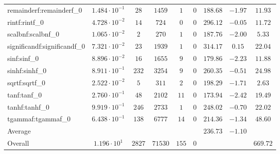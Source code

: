 \begin{tabular}{|l|c|c|c|c|c|c|c|c|}
remainderf:remainderf\_0     & $ 1.484 \cdot 10^{-1} $ & $ 28     $ & $ 1459  $ & $ 1   $ & $ 0   $ & $ 188.68      $ & $ -1.97   $ & $ 11.93   $ \\
rintf:rintf\_0               & $ 4.728 \cdot 10^{-2} $ & $ 14     $ & $ 724   $ & $ 0   $ & $ 0   $ & $ 296.12      $ & $ -0.05   $ & $ 11.72   $ \\
scalbnf:scalbnf\_0           & $ 1.065 \cdot 10^{-2} $ & $ 2      $ & $ 270   $ & $ 1   $ & $ 0   $ & $ 187.76      $ & $ -2.00   $ & $ 5.33    $ \\
significandf:significandf\_0 & $ 7.321 \cdot 10^{-2} $ & $ 23     $ & $ 1939  $ & $ 1   $ & $ 0   $ & $ 314.17      $ & $ 0.15    $ & $ 22.04   $ \\
sinf:sinf\_0                 & $ 8.896 \cdot 10^{-2} $ & $ 16     $ & $ 1655  $ & $ 9   $ & $ 0   $ & $ 179.86      $ & $ -2.23   $ & $ 11.88   $ \\
sinhf:sinhf\_0               & $ 8.911 \cdot 10^{-1} $ & $ 232    $ & $ 3254  $ & $ 9   $ & $ 0   $ & $ 260.35      $ & $ -0.51   $ & $ 24.98   $ \\
sqrtf:sqrtf\_0               & $ 2.522 \cdot 10^{-2} $ & $ 5      $ & $ 311   $ & $ 2   $ & $ 0   $ & $ 198.29      $ & $ -1.71   $ & $ 2.63    $ \\
tanf:tanf\_0                 & $ 2.760 \cdot 10^{-1} $ & $ 48     $ & $ 2102  $ & $ 11  $ & $ 0   $ & $ 173.94      $ & $ -2.42   $ & $ 19.49   $ \\
tanhf:tanhf\_0               & $ 9.919 \cdot 10^{-1} $ & $ 246    $ & $ 2733  $ & $ 1   $ & $ 0   $ & $ 248.02      $ & $ -0.70   $ & $ 22.02   $ \\
tgammaf:tgammaf\_0           & $ 6.438 \cdot 10^{-1} $ & $ 138    $ & $ 6777  $ & $ 14  $ & $ 0   $ & $ 214.36      $ & $ -1.34   $ & $ 48.60   $ \\
\hline
Average                      & $                     $ & $        $ & $       $ & $     $ & $     $ & $ 236.73      $ & $ -1.10   $ & $         $ \\
\hline
Overall                      & $ 1.196 \cdot 10^{1}  $ & $ 2827   $ & $ 71530 $ & $ 155 $ & $ 0   $ & $             $ & $         $ & $ 669.72  $ \\
\hline
\end{tabular}
